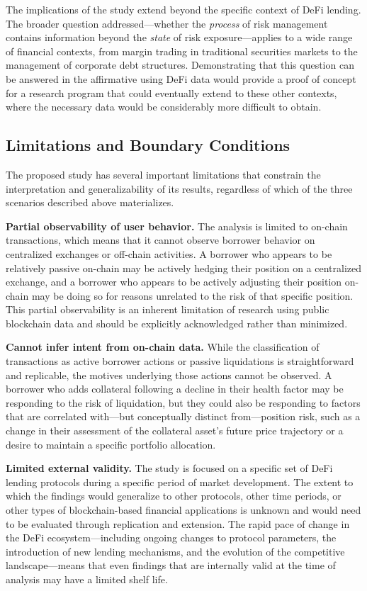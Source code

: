 The implications of the study extend beyond the specific context of DeFi lending. The broader question addressed—whether the \emph{process} of risk management contains information beyond the \emph{state} of risk exposure—applies to a wide range of financial contexts, from margin trading in traditional securities markets to the management of corporate debt structures. Demonstrating that this question can be answered in the affirmative using DeFi data would provide a proof of concept for a research program that could eventually extend to these other contexts, where the necessary data would be considerably more difficult to obtain.

\subsection{Limitations and Boundary Conditions}

The proposed study has several important limitations that constrain the interpretation and generalizability of its results, regardless of which of the three scenarios described above materializes.

\textbf{Partial observability of user behavior.} The analysis is limited to on-chain transactions, which means that it cannot observe borrower behavior on centralized exchanges or off-chain activities. A borrower who appears to be relatively passive on-chain may be actively hedging their position on a centralized exchange, and a borrower who appears to be actively adjusting their position on-chain may be doing so for reasons unrelated to the risk of that specific position. This partial observability is an inherent limitation of research using public blockchain data and should be explicitly acknowledged rather than minimized.

\textbf{Cannot infer intent from on-chain data.} While the classification of transactions as active borrower actions or passive liquidations is straightforward and replicable, the motives underlying those actions cannot be observed. A borrower who adds collateral following a decline in their health factor may be responding to the risk of liquidation, but they could also be responding to factors that are correlated with—but conceptually distinct from—position risk, such as a change in their assessment of the collateral asset's future price trajectory or a desire to maintain a specific portfolio allocation.

\textbf{Limited external validity.} The study is focused on a specific set of DeFi lending protocols during a specific period of market development. The extent to which the findings would generalize to other protocols, other time periods, or other types of blockchain-based financial applications is unknown and would need to be evaluated through replication and extension. The rapid pace of change in the DeFi ecosystem—including ongoing changes to protocol parameters, the introduction of new lending mechanisms, and the evolution of the competitive landscape—means that even findings that are internally valid at the time of analysis may have a limited shelf life.

